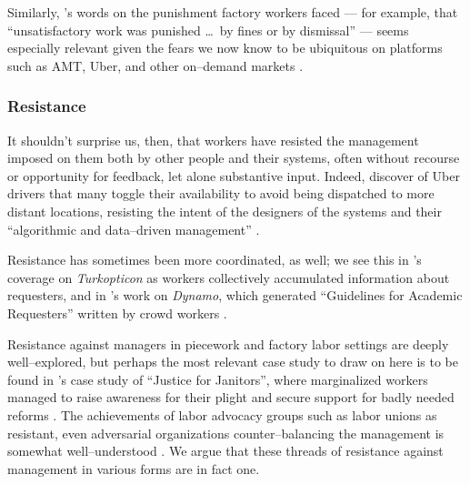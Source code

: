 \documentclass[trackingWork]{subfiles}
\begin{document}
{Similarly, \citeauthor{pollard1963factory}'s words on the punishment factory workers faced ---
for example, that ``unsatisfactory work was punished \dots~by fines or by dismissal'' ---
seems especially relevant given the fears we now know to be ubiquitous on platforms such as AMT, Uber, and other on--demand markets
\cite{pollard1963factory,uberAlgorithm,dynamo,turkopticon,takingAHITMcInnis}.

\subsubsection{Resistance}
It shouldn't surprise us, then, that workers have resisted the management imposed on them both by other people and their systems,
often without recourse or opportunity for feedback, let alone substantive input.
Indeed, \citeauthor{uberAlgorithm} discover of Uber drivers that 
many toggle their availability to avoid being dispatched to more distant locations,
resisting the intent of the designers of the systems and their ``algorithmic and data--driven management''
\cite{uberAlgorithm}.

Resistance has sometimes been more coordinated, as well;
we see this in \citeauthor{turkopticon}'s coverage on \textit{Turkopticon} as workers collectively accumulated information about requesters, and
in \citeauthor{dynamo}'s work on \textit{Dynamo}, which generated ``Guidelines for Academic Requesters'' written by crowd workers
\cite{turkopticon,dynamo}.

Resistance against managers in piecework and factory labor settings are deeply well--explored,
but perhaps the most relevant case study to draw on here is to be found in
\citeauthor{waldinger1996helots}'s case study of ``Justice for Janitors'',
where marginalized workers managed to raise awareness for their plight and secure support for badly needed reforms
\cite{waldinger1996helots}.
The achievements of labor advocacy groups such as labor unions as resistant,
even adversarial organizations counter--balancing the management
is somewhat well--understood
\cite{russell1982collective,craig1992behavior}.
We argue that these threads of resistance against management in various forms
are in fact one.
}


\onlyinsubfile{
  \balance{}
  \printbibliography
}
\end{document}
